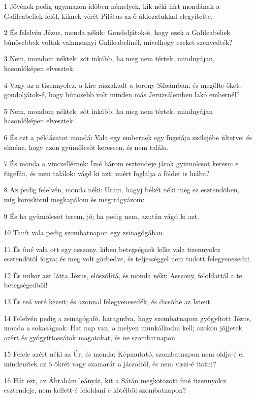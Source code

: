 \par 1 Jövének pedig ugyanazon idõben némelyek, kik néki hírt mondának a Galileabeliek felõl, kiknek vérét Pilátus az õ áldozatukkal elegyítette.
\par 2 És felelvén Jézus, monda nékik: Gondoljátok-é, hogy ezek a Galileabeliek bûnösebbek voltak valamennyi Galileabelinél, mivelhogy ezeket szenvedték?
\par 3 Nem, mondom néktek: sõt inkább, ha meg nem tértek, mindnyájan, hasonlóképen elvesztek.
\par 4 Vagy az a tizennyolcz, a kire rászakadt a torony Siloámban, és megölte õket, gondoljátok-é, hogy bûnösebb volt minden más Jeruzsálemben lakó embernél?
\par 5 Nem, mondom néktek: sõt inkább, ha meg nem tértek, mindnyájan hasonlóképen elvesztek.
\par 6 És ezt a példázatot mondá: Vala egy embernek egy fügefája szõlejébe ültetve; és elméne, hogy azon gyümölcsöt keressen, és nem talála.
\par 7 És monda a vinczellérnek: Ímé három esztendeje járok gyümölcsöt keresni e fügefán, és nem találok: vágd ki azt; miért foglalja a földet is hiába?
\par 8 Az pedig felelvén, monda néki: Uram, hagyj békét néki még ez esztendõben, míg köröskörül megkapálom és megtrágyázom:
\par 9 És ha gyümölcsöt terem, jó; ha pedig nem, azután vágd ki azt.
\par 10 Tanít vala pedig szombatnapon egy zsinagógában.
\par 11 És ímé vala ott egy asszony, kiben betegségnek lelke vala tizennyolcz esztendõtõl fogva; és meg volt görbedve, és teljességgel nem tudott felegyenesedni.
\par 12 És mikor azt látta Jézus, elõszólítá, és monda néki: Asszony, feloldattál a te betegségedbõl!
\par 13 És reá veté kezeit; és azonnal felegyenesedék, és dicsõíté az Istent.
\par 14 Felelvén pedig a zsinagógafõ, haragudva, hogy szombatnapon gyógyított Jézus, monda a sokaságnak: Hat nap van, a melyen munkálkodni kell; azokon jõjjetek azért és gyógyíttassátok magatokat, és ne szombatnapon.
\par 15 Felele azért néki az Úr, és monda: Képmutató, szombatnapon nem oldja-é el mindenitek az õ ökrét vagy szamarát a jászoltól, és nem viszi-é itatni?
\par 16 Hát ezt, az Ábrahám leányát, kit a Sátán megkötözött ímé tizennyolcz esztendeje, nem kellett-é feloldani e kötélbõl szombatnapon?
